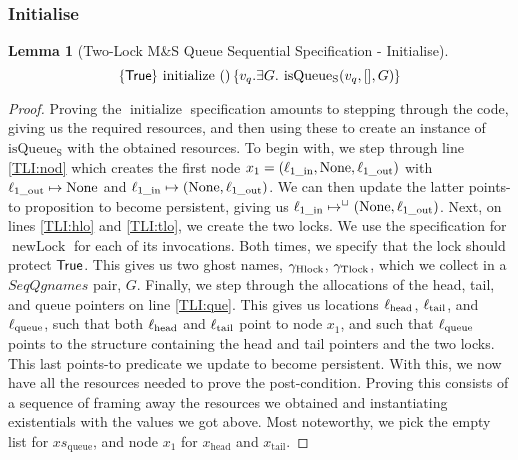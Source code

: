 \documentclass[a4paper, 10pt]{report}
\theoremstyle{definition}
\newtheorem{lemma}[theorem]{Lemma}
\newcommand{\newLock}{\operatorname{newLock}}
\newcommand{\initialise}{\operatorname{initialize}}
\newcommand{\msq}{M\&S Queue}
\newcommand{\tlmsq}{Two-Lock \msq{}}
\newcommand{\isqueueseq}{\operatorname{isQueue_{S}}}
\newcommand{\SeqQgnames}{SeqQgnames}
\newcommand{\vq}{v_q}
\newcommand{\xsqueue}{xs_{\mathrm{queue}}}
\newcommand{\locinM}[1]{\loc_{#1\_\mathrm{in}}}
\newcommand{\locoutM}[1]{\loc_{#1\_\mathrm{out}}}
\newcommand{\locN}[1]{\loc_{\mathrm{#1}}}
\newcommand{\lochead}{\locN{head}}
\newcommand{\loctail}{\locN{tail}}
\newcommand{\locqueue}{\locN{queue}}
\newcommand{\node}{x}
\newcommand{\nodeM}[1]{\node_{#1}}
\newcommand{\nodeN}[1]{\node_{\mathrm{#1}}}
\newcommand{\nodehead}{\nodeN{head}}
\newcommand{\nodetail}{\nodeN{tail}}
\newcommand{\Qg}{G}
\newcommand{\ghlock}{\gname_{\mathrm{Hlock}}}
\newcommand{\gtlock}{\gname_{\mathrm{Tlock}}}
\newcommand{\seqspecinitHTGen}[2]{\hoare{\TRUE}{\initialise \ \TT}{#1 . \Exists #2. \isqueueseq(#1, [], #2)}}
\newcommand{\seqspecinitGen}[2]{\seqspecinitHTGen{#1}{#2}}
\newcommand{\seqspecinit}{\seqspecinitGen{\vq}{\Qg}}
\begin{document}
\subsubsection{Initialise}
\begin{lemma}[\tlmsq{} Sequential Specification - Initialise]\label{TLMSQ:spec:seq:init}
  \begin{equation*}
    \seqspecinit
  \end{equation*}
\end{lemma}
\begin{proof}
Proving the $\initialise$ specification amounts to stepping through the code, giving us the required resources, and then using these to create an instance of $\isqueueseq$ with the obtained resources. To begin with, we step through line \ref{TLI:nod} which creates the first node $\nodeM{1} = (\locinM{1}, \None, \locoutM{1})$ with $\locoutM{1} \mapsto \None$ and $\locinM{1} \mapsto (\None, \locoutM{1})$. We can then update the latter points-to proposition to become persistent, giving us $\locinM{1} \mapsto^{\persistently} (\None, \locoutM{1})$. Next, on lines \ref{TLI:hlo} and \ref{TLI:tlo}, we create the two locks. We use the specification for $\newLock$ for each of its invocations. Both times, we specify that the lock should protect $\textsf{True}$. This gives us two ghost names, $\ghlock$, $\gtlock$, which we collect in a $\SeqQgnames$ pair, $\Qg$.
Finally, we step through the allocations of the head, tail, and queue pointers on line \ref{TLI:que}. This gives us locations $\lochead$, $\loctail$, and $\locqueue$, such that both $\lochead$ and $\loctail$ point to node $\nodeM{1}$, and such that $\locqueue$ points to the structure containing the head and tail pointers and the two locks. This last points-to predicate we update to become persistent.
With this, we now have all the resources needed to prove the post-condition. Proving this consists of a sequence of framing away the resources we obtained and instantiating existentials with the values we got above. Most noteworthy, we pick the empty list for $\xsqueue$, and node $\nodeM{1}$ for $\nodehead$ and $\nodetail$.
\end{proof}
\end{document}
